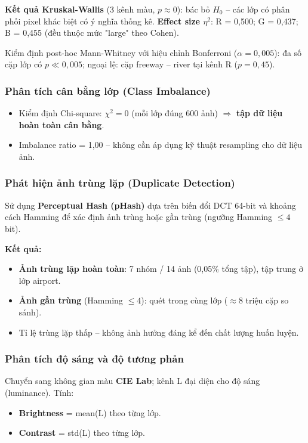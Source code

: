 \documentclass[12pt,a4paper]{article}
\let\oldtextbf\textbf
\renewcommand{\textbf}[1]{\oldtextbf{\textcolor{hcmublue}{#1}}}
\begin{document}
\textbf{Kết quả Kruskal-Wallis} (3 kênh màu, $p \approx 0$): bác bỏ $H_0$ -- các lớp có phân phối pixel khác biệt có ý nghĩa thống kê. \textbf{Effect size $\eta^2$}: R = 0,500; G = 0,437; B = 0,455 (đều thuộc mức "large" theo Cohen).

Kiểm định post-hoc Mann-Whitney với hiệu chỉnh Bonferroni ($\alpha = 0{,}005$): đa số cặp lớp có $p \ll 0{,}005$; ngoại lệ: cặp freeway -- river tại kênh R ($p = 0{,}45$).

\subsubsection{Phân tích cân bằng lớp (Class Imbalance)}

\begin{itemize}
    \item Kiểm định Chi-square: $\chi^2 = 0$ (mỗi lớp đúng 600 ảnh) $\Rightarrow$ \textbf{tập dữ liệu hoàn toàn cân bằng}.
    \item Imbalance ratio = 1,00 -- không cần áp dụng kỹ thuật resampling cho dữ liệu ảnh.
\end{itemize}

\subsubsection{Phát hiện ảnh trùng lặp (Duplicate Detection)}

Sử dụng \textbf{Perceptual Hash (pHash)} dựa trên biến đổi DCT 64-bit và khoảng cách Hamming để xác định ảnh trùng hoặc gần trùng (ngưỡng Hamming $\leq 4$ bit).

\textbf{Kết quả:}
\begin{itemize}
    \item \textbf{Ảnh trùng lặp hoàn toàn}: 7 nhóm / 14 ảnh (0,05\% tổng tập), tập trung ở lớp airport.
    \item \textbf{Ảnh gần trùng} (Hamming $\leq 4$): quét trong cùng lớp ($\approx 8$ triệu cặp so sánh).
    \item Tỉ lệ trùng lặp thấp -- không ảnh hưởng đáng kể đến chất lượng huấn luyện.
\end{itemize}

\subsubsection{Phân tích độ sáng và độ tương phản}

Chuyển sang không gian màu \textbf{CIE Lab}; kênh L đại diện cho độ sáng (luminance). Tính:
\begin{itemize}
    \item \textbf{Brightness} = mean(L) theo từng lớp.
    \item \textbf{Contrast} = std(L) theo từng lớp.
\end{itemize}
\end{document}
